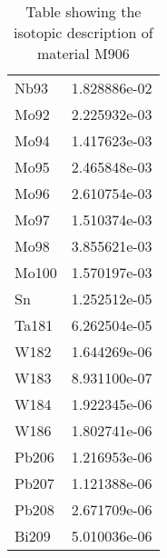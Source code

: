 \begin{centering}
\begin{table}[ht!]
\begin{tabular}{l | c}
Nb93 & 1.828886e-02\\
Mo92 & 2.225932e-03\\
Mo94 & 1.417623e-03\\
Mo95 & 2.465848e-03\\
Mo96 & 2.610754e-03\\
Mo97 & 1.510374e-03\\
Mo98 & 3.855621e-03\\
Mo100 & 1.570197e-03\\
Sn & 1.252512e-05\\
Ta181 & 6.262504e-05\\
W182 & 1.644269e-06\\
W183 & 8.931100e-07\\
W184 & 1.922345e-06\\
W186 & 1.802741e-06\\
Pb206 & 1.216953e-06\\
Pb207 & 1.121388e-06\\
Pb208 & 2.671709e-06\\
Bi209 & 5.010036e-06
\end{tabular}
\caption{Table showing the isotopic description of material M906}
\label{table:material_M906}
\end{table}\clearpage


\end{centering}
